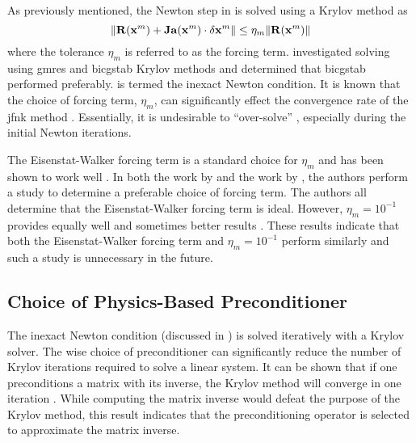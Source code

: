     As previously mentioned, the Newton step in  is solved
    using a Krylov method as
    \begin{equation}
      \label{eq:inexact_newton_condition}
      \| \mathbf{R}(\mathbf{x}^m) + \mathbf{Ja}(\mathbf{x}^m) \cdot \delta\mathbf{x}^m \| \le 
        \eta_m \| \mathbf{R}(\mathbf{x}^m) \|
    \end{equation}
    where the tolerance $\eta_m$ is referred to as the forcing term.
    \citeauthor{qe2paper} investigated solving
     using \gls{gmres} and \gls{bicgstab}
    Krylov methods and determined that \gls{bicgstab} performed preferably.
     is termed the inexact Newton condition.
    It is known that the choice of forcing term, $\eta_m$, can significantly
    effect the convergence rate of the \gls{jfnk} method \cite{textbookkelley}.
    Essentially, it is undesirable to ``over-solve''
    , especially during the initial Newton
    iterations.

    The Eisenstat-Walker forcing term is a standard choice for $\eta_m$ and has
    been shown to work well \cite{qe2paper,gill_azmy}. In both the work by
    \citeauthor{qe2paper} and the work by \citeauthor{gill_azmy}, the authors
    perform a study to determine a preferable choice of forcing term. The
    authors all determine that the Eisenstat-Walker forcing term is ideal.
    However, $\eta_m = 10^{-1}$ provides equally well and sometimes better
    results \cite{qe2paper,gill_azmy,jfnk_wielandt,ma784notes}. These results 
    indicate that both the Eisenstat-Walker forcing term and $\eta_m = 10^{-1}$
    perform similarly and such a study is unnecessary in the future.

  \subsection{Choice of Physics-Based Preconditioner}

    The inexact Newton condition (discussed in
    ) is solved iteratively with a Krylov solver.
    The wise choice of preconditioner can significantly reduce the number of
    Krylov iterations required to solve a linear system. It can be shown that
    if one preconditions a matrix with its inverse, the Krylov method will
    converge in one iteration \cite{textbookkelley}. While computing the
    matrix inverse would defeat the purpose of the Krylov method, this result
    indicates that the preconditioning operator is selected to approximate the
    matrix inverse.

